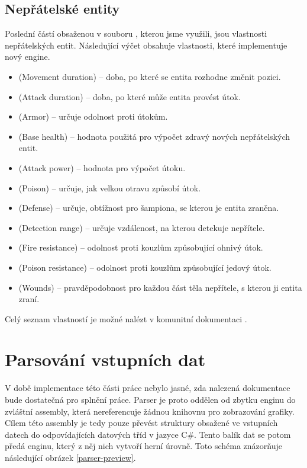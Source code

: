 \subsection{Nepřátelské entity}\label{properties-creatures}

Poslední částí obsaženou v souboru , kterou jsme využili, jsou vlastnosti nepřátelských entit.
Následující výčet obsahuje vlastnosti, které implementuje nový engine. 
\begin{itemize}
\item {} (Movement duration) -- doba, po které se entita rozhodne změnit pozici.
\item {} (Attack duration) -- doba, po které může entita provést útok.
\item {} (Armor) -- určuje odolnost proti útokům.
\item {} (Base health) -- hodnota použitá pro výpočet zdravý nových nepřátelských entit.
\item {} (Attack power) -- hodnota pro výpočet útoku.
\item {} (Poison)  -- určuje, jak velkou otravu způsobí útok. 
\item {} (Defense) -- určuje, obtížnost pro šampiona, se kterou je entita zraněna. 
\item {} (Detection range) -- určuje vzdálenost, na kterou detekuje nepřítele. 
\item {} (Fire resistance) -- odolnost proti kouzlům způsobující ohnivý útok.
\item {} (Poison resistance) -- odolnost proti kouzlům způsobující jedový útok.
\item {} (Wounds) -- pravděpodobnost pro každou část těla nepřítele, s kterou ji entita zraní.
\end{itemize}

Celý seznam vlastností je možné nalézt v komunitní dokumentaci \cite{DMCreatures}.


\section{Parsování vstupních dat}\label{level-parsing}

V době implementace této části práce nebylo jasné, zda nalezená dokumentace \cite{TechnicalDocumentationFontanel05} bude dostatečná
pro splnění práce. Parser je proto oddělen od zbytku enginu do zvláštní assembly, která nereferencuje žádnou knihovnu
pro zobrazování grafiky. Cílem této assembly je tedy pouze převést struktury obsažené ve vstupních datech do odpovídajících
datových tříd v jazyce C\#. Tento balík dat se potom předá enginu, který z něj nich vytvoří herní úrovně. Toto schéma 
znázorňuje následující obrázek \ref{parser-preview}.


